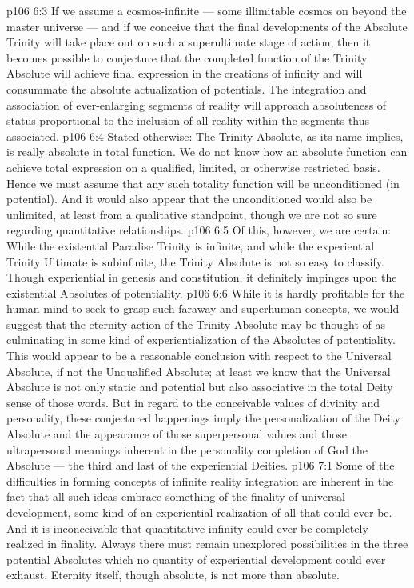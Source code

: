 \vs p106 6:3 If we assume a cosmos\hyp{}infinite --- some illimitable cosmos on beyond the master universe --- and if we conceive that the final developments of the Absolute Trinity will take place out on such a superultimate stage of action, then it becomes possible to conjecture that the completed function of the Trinity Absolute will achieve final expression in the creations of infinity and will consummate the absolute actualization of  potentials. The integration and association of ever\hyp{}enlarging segments of reality will approach absoluteness of status proportional to the inclusion of all reality within the segments thus associated.
\vs p106 6:4 Stated otherwise: The Trinity Absolute, as its name implies, is really absolute in total function. We do not know how an absolute function can achieve total expression on a qualified, limited, or otherwise restricted basis. Hence we must assume that any such totality function will be unconditioned (in potential). And it would also appear that the unconditioned would also be unlimited, at least from a qualitative standpoint, though we are not so sure regarding quantitative relationships.
\vs p106 6:5 Of this, however, we are certain: While the existential Paradise Trinity is infinite, and while the experiential Trinity Ultimate is subinfinite, the Trinity Absolute is not so easy to classify. Though experiential in genesis and constitution, it definitely impinges upon the existential Absolutes of potentiality.
\vs p106 6:6 While it is hardly profitable for the human mind to seek to grasp such faraway and superhuman concepts, we would suggest that the eternity action of the Trinity Absolute may be thought of as culminating in some kind of experientialization of the Absolutes of potentiality. This would appear to be a reasonable conclusion with respect to the Universal Absolute, if not the Unqualified Absolute; at least we know that the Universal Absolute is not only static and potential but also associative in the total Deity sense of those words. But in regard to the conceivable values of divinity and personality, these conjectured happenings imply the personalization of the Deity Absolute and the appearance of those superpersonal values and those ultrapersonal meanings inherent in the personality completion of God the Absolute --- the third and last of the experiential Deities.
\vs p106 7:1 Some of the difficulties in forming concepts of infinite reality integration are inherent in the fact that all such ideas embrace something of the finality of universal development, some kind of an experiential realization of all that could ever be. And it is inconceivable that quantitative infinity could ever be completely realized in finality. Always there must remain unexplored possibilities in the three potential Absolutes which no quantity of experiential development could ever exhaust. Eternity itself, though absolute, is not more than absolute.
